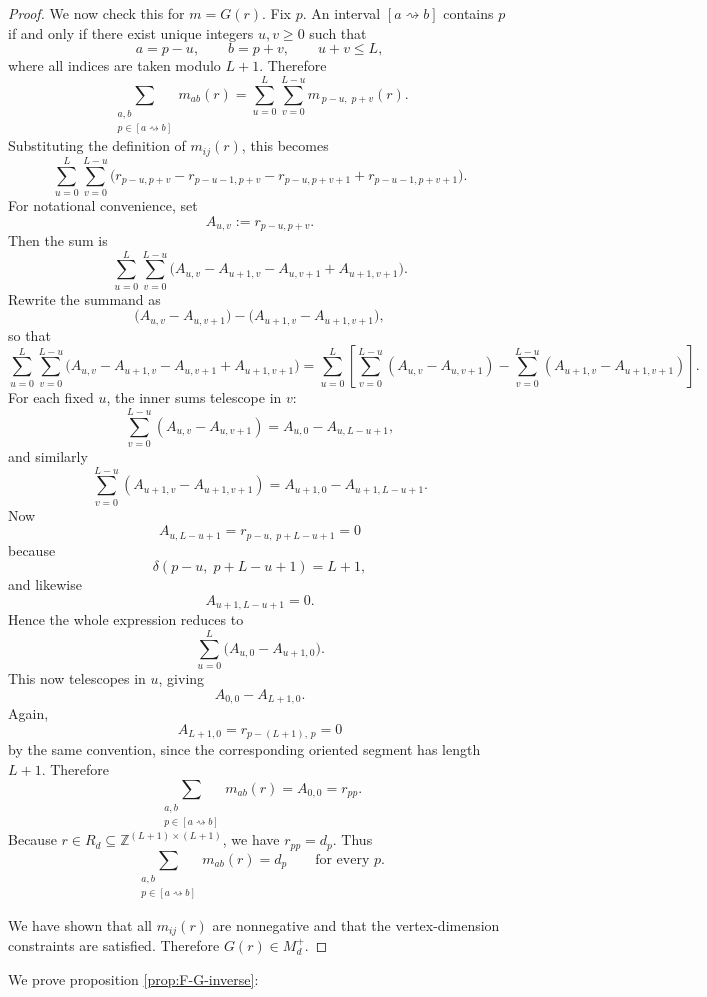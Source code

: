 \documentclass{article}
\theoremstyle{definition}
\begin{document}
\begin{proof}
We now check this for \(m=G(r)\).
Fix \(p\). An interval \([a\rightsquigarrow b]\) contains \(p\) if and only if there exist
unique integers \(u,v\ge 0\) such that
\[
a=p-u,\qquad b=p+v,\qquad u+v\le L,
\]
where all indices are taken modulo \(L+1\). Therefore
\[
\sum_{\substack{a,b\\ p\in [a\rightsquigarrow b]}} m_{ab}(r)
=
\sum_{u=0}^L \sum_{v=0}^{L-u} m_{\,p-u,\;p+v}(r).
\]
Substituting the definition of \(m_{ij}(r)\), this becomes
\[
\sum_{u=0}^L \sum_{v=0}^{L-u}
\bigl(
r_{p-u,p+v}
-r_{p-u-1,p+v}
-r_{p-u,p+v+1}
+r_{p-u-1,p+v+1}
\bigr).
\]
For notational convenience, set
\[
A_{u,v}:=r_{p-u,p+v}.
\]
Then the sum is
\[
\sum_{u=0}^L \sum_{v=0}^{L-u}
\bigl(A_{u,v}-A_{u+1,v}-A_{u,v+1}+A_{u+1,v+1}\bigr).
\]
Rewrite the summand as
\[
\bigl(A_{u,v}-A_{u,v+1}\bigr)-\bigl(A_{u+1,v}-A_{u+1,v+1}\bigr),
\]
so that
\[
\sum_{u=0}^L \sum_{v=0}^{L-u}
\bigl(A_{u,v}-A_{u+1,v}-A_{u,v+1}+A_{u+1,v+1}\bigr)
=
\sum_{u=0}^L
\left[
\sum_{v=0}^{L-u} (A_{u,v}-A_{u,v+1})
-
\sum_{v=0}^{L-u} (A_{u+1,v}-A_{u+1,v+1})
\right].
\]
For each fixed \(u\), the inner sums telescope in \(v\):
\[
\sum_{v=0}^{L-u} (A_{u,v}-A_{u,v+1})
=
A_{u,0}-A_{u,L-u+1},
\]
and similarly
\[
\sum_{v=0}^{L-u} (A_{u+1,v}-A_{u+1,v+1})
=
A_{u+1,0}-A_{u+1,L-u+1}.
\]
Now
\[
A_{u,L-u+1}=r_{p-u,\;p+L-u+1}=0
\]
because
\[
\delta(p-u,\;p+L-u+1)=L+1,
\]
and likewise
\[
A_{u+1,L-u+1}=0.
\]
Hence the whole expression reduces to
\[
\sum_{u=0}^L \bigl(A_{u,0}-A_{u+1,0}\bigr).
\]
This now telescopes in \(u\), giving
\[
A_{0,0}-A_{L+1,0}.
\]
Again,
\[
A_{L+1,0}=r_{p-(L+1),\,p}=0
\]
by the same convention, since the corresponding oriented segment has length \(L+1\).
Therefore
\[
\sum_{\substack{a,b\\ p\in [a\rightsquigarrow b]}} m_{ab}(r)
=
A_{0,0}
=
r_{pp}.
\]
Because \(r\in R_d\subseteq \mathbb{Z}^{(L+1)\times(L+1)}\), we have \(r_{pp}=d_p\). Thus
\[
\sum_{\substack{a,b\\ p\in [a\rightsquigarrow b]}} m_{ab}(r)=d_p
\qquad\text{for every }p.
\]

We have shown that all \(m_{ij}(r)\) are nonnegative and that the vertex-dimension
constraints are satisfied. Therefore \(G(r)\in M_d^+\).
\end{proof}
We prove proposition \ref{prop:F-G-inverse}:
\end{document}
